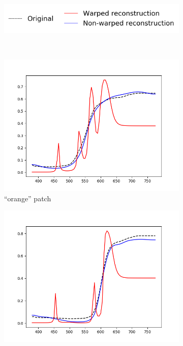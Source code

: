 \begin{figure}[t]
	\centering
	\captionsetup[subfigure]{font=footnotesize,labelfont=footnotesize}
	\captionsetup[subfigure]{justification=centering}
	\begin{subfigure}[t]{0.50\textwidth}
		\includegraphics[width=\linewidth]{img/results_techniqueLegend.png}
	\end{subfigure} \\
	\begin{subfigure}[t]{0.32\textwidth}
		\includegraphics[width=\linewidth]{img/results_warping_orange.png}
		\caption{``orange'' patch}
		\label{fig:warping_alp_neutral50}
	\end{subfigure} \hspace{0.1em}
	\begin{subfigure}[t]{0.32\textwidth}
	\includegraphics[width=\linewidth]{img/results_warping_red.png}

\end{subfigure}
\end{figure}
